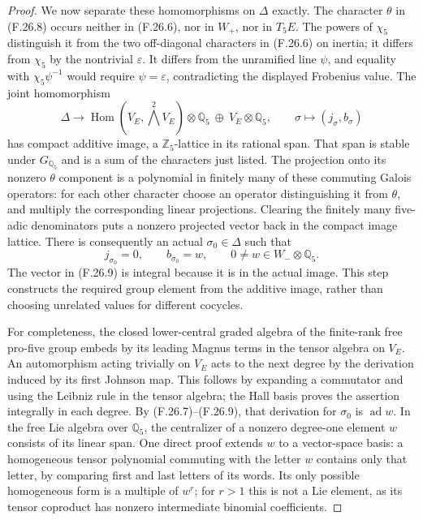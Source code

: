 \begin{proof}
We now separate these homomorphisms on $\Delta$ exactly.
The character $\theta$ in (F.26.8) occurs neither in
(F.26.6), nor in $W_+$, nor in $T_5E$.
The powers of $\chi_5$ distinguish it from the two
off-diagonal characters in (F.26.6) on inertia; it differs
from $\chi_5$ by the nontrivial $\varepsilon$.
It differs from the unramified line $\psi$, and equality
with $\chi_5\psi^{-1}$ would require $\psi=\varepsilon$,
contradicting the displayed Frobenius value.
The joint homomorphism
\[
 \Delta\longrightarrow
  \operatorname{Hom}(V_E,\bigwedge^2V_E)\otimes\mathbb Q_5
           \ \oplus\ V_E\otimes\mathbb Q_5,\qquad
                 \sigma\longmapsto(j_\sigma,b_\sigma)
\]
has compact additive image, a $\mathbb Z_5$-lattice in
its rational span. That span is stable under
$G_{\mathbb Q_5}$ and is a sum of the characters just listed.
The projection onto its nonzero $\theta$ component is a
polynomial in finitely many of these commuting Galois
operators: for each other character choose an operator
distinguishing it from $\theta$, and multiply the corresponding
linear projections. Clearing the finitely many five-adic
denominators puts a nonzero projected vector back in the
compact image lattice. There is consequently an actual
$\sigma_0\in\Delta$ such that
\[
               j_{\sigma_0}=0,\qquad b_{\sigma_0}=w,
                    \qquad 0\ne w\in W_-\otimes\mathbb Q_5.
                                                               \tag{F.26.9}
\]
The vector in (F.26.9) is integral because it is in the
actual image. This step constructs the required group
element from the additive image, rather than choosing
unrelated values for different cocycles.

For completeness, the closed lower-central graded algebra
of the finite-rank free pro-five group embeds by its leading
Magnus terms in the tensor algebra on $V_E$.
An automorphism acting trivially on $V_E$ acts to the next
degree by the derivation induced by its first Johnson map.
This follows by expanding a commutator and using the
Leibniz rule in the tensor algebra; the Hall basis proves
the assertion integrally in each degree.
By (F.26.7)--(F.26.9), that derivation for $\sigma_0$
is $\operatorname{ad}w$.
In the free Lie algebra over $\mathbb Q_5$, the centralizer
of a nonzero degree-one element $w$ consists of its linear
span. One direct proof extends $w$ to a vector-space basis:
a homogeneous tensor polynomial commuting with the letter
$w$ contains only that letter, by comparing first and last
letters of its words. Its only possible homogeneous form
is a multiple of $w^r$; for $r>1$ this is not a Lie
element, as its tensor coproduct has nonzero intermediate
binomial coefficients.


\end{proof}
